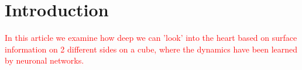 \section{Introduction}
% 




\textcolor{red}{In this article we examine how deep we can 'look' into the heart based on surface information on 2 different sides on a cube, where the dynamics have been learned by neuronal networks.}


